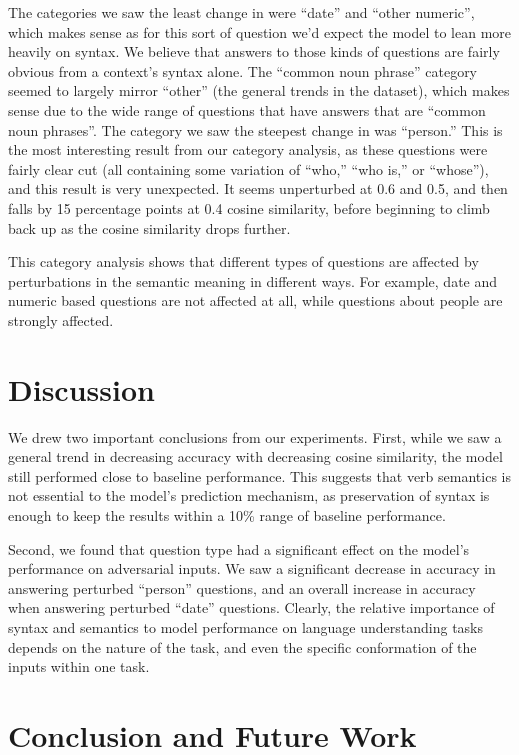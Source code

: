 \documentclass[11pt,a4paper]{article}
\begin{document}
The categories we saw the least change in were ``date'' and ``other numeric'', which makes sense as for this sort of question we'd expect the model to lean more heavily on syntax. We believe that answers to those kinds of questions are fairly obvious from a context's syntax alone. The ``common noun phrase'' category seemed to largely mirror ``other'' (the general trends in the dataset), which makes sense due to the wide range of questions that have answers that are ``common noun phrases''. The category we saw the steepest change in was ``person.'' This is the most interesting result from our category analysis, as these questions were fairly clear cut (all containing some variation of ``who,'' ``who is,'' or ``whose''), and this result is very unexpected. It seems unperturbed at 0.6 and 0.5, and then falls by 15 percentage points at 0.4 cosine similarity, before beginning to climb back up as the cosine similarity drops further.

This category analysis shows that different types of questions are affected by perturbations in the semantic meaning in different ways. For example, date and numeric based questions are not affected at all, while questions about people are strongly affected.



\section{Discussion}
We drew two important conclusions from our experiments. First, while we saw a general trend in decreasing accuracy with decreasing cosine similarity, the model still performed close to baseline performance. This suggests that verb semantics is not essential to the model's prediction mechanism, as preservation of syntax is enough to keep the results within a 10\% range of baseline performance. 



Second, we found that question type had a significant effect on the model's performance on adversarial inputs. We saw a significant decrease in accuracy in answering perturbed ``person'' questions, and an overall increase in accuracy when answering perturbed ``date'' questions. Clearly, the relative importance of syntax and semantics to model performance on language understanding tasks depends on the nature of the task, and even the specific conformation of the inputs within one task.  



\section{Conclusion and Future Work}
\end{document}
